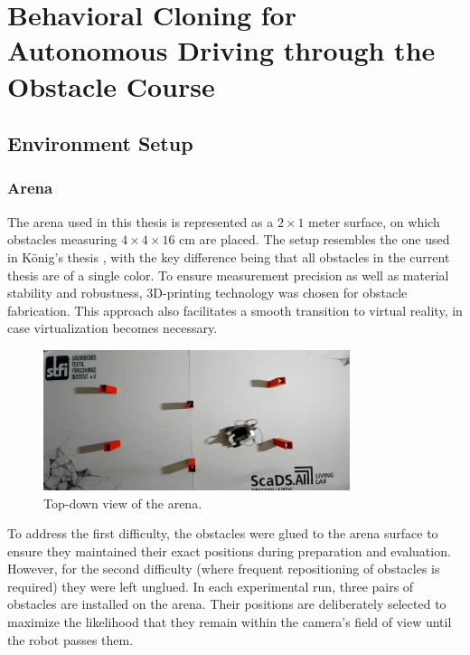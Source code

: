 \chapter{Behavioral Cloning for Autonomous Driving through the Obstacle Course}
\label{cha:Main}

\section{Environment Setup}

\subsection{Arena}

The arena used in this thesis is represented as a \(2 \times 1\) meter surface, on which obstacles measuring \(4 \times 4 \times 16\) cm are placed. The setup resembles the one used in König’s thesis \autocite{konig2022model}, with the key difference being that all obstacles in the current thesis are of a single color. To ensure measurement precision as well as material stability and robustness, 3D-printing technology was chosen for obstacle fabrication. This approach also facilitates a smooth transition to virtual reality, in case virtualization becomes necessary.

\begin{figure}[htbp]
  \centering
  \includegraphics[width=0.8\textwidth]{Images/JetBot/top_down_arena_view.png}
  \caption{Top-down view of the arena.}
  \label{fig:arena}
\end{figure}

To address the first difficulty, the obstacles were glued to the arena surface to ensure they maintained their exact positions during preparation and evaluation. However, for the second difficulty (where frequent repositioning of obstacles is required) they were left unglued. In each experimental run, three pairs of obstacles are installed on the arena. Their positions are deliberately selected to maximize the likelihood that they remain within the camera’s field of view until the robot passes them.

